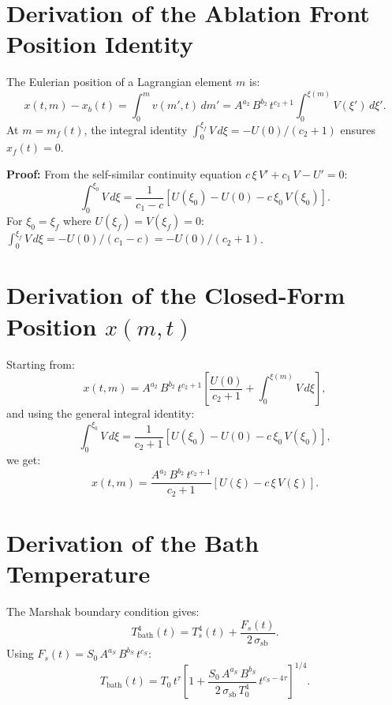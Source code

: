 \documentclass[11pt]{article}
\newcommand{\xsi}{\xi}
\newcommand{\xsif}{\xi_f}
\begin{document}
\section{Derivation of the Ablation Front Position Identity}
\label{app:xf}

The Eulerian position of a Lagrangian element $m$ is:
\begin{equation}
  x(t,m) - x_b(t) = \int_0^m v(m',t)\,dm' = A^{a_2}\,B^{b_2}\,t^{c_2+1}\int_0^{\xsi(m)} V(\xsi')\,d\xsi'.
\end{equation}
At $m = m_f(t)$, the integral identity $\int_0^{\xsif} V\,d\xsi = -U(0)/(c_2+1)$ ensures $x_f(t) = 0$.

\textbf{Proof:} From the self-similar continuity equation $c\,\xsi\,V' + c_1\,V - U' = 0$:
\begin{equation}
  \int_0^{\xsi_0} V\,d\xsi = \frac{1}{c_1-c}\left[U(\xsi_0) - U(0) - c\,\xsi_0\,V(\xsi_0)\right].
\end{equation}
For $\xsi_0 = \xsif$ where $U(\xsif) = V(\xsif) = 0$: $\int_0^{\xsif} V\,d\xsi = -U(0)/(c_1-c) = -U(0)/(c_2+1)$.

\section{Derivation of the Closed-Form Position $x(m,t)$}
\label{app:x_closed}

Starting from:
\begin{equation}
  x(t,m) = A^{a_2}\,B^{b_2}\,t^{c_2+1}\left[\frac{U(0)}{c_2+1} + \int_0^{\xsi(m)} V\,d\xsi\right],
\end{equation}
and using the general integral identity:
\begin{equation}
  \int_0^{\xsi_0} V\,d\xsi = \frac{1}{c_2+1}\left[U(\xsi_0) - U(0) - c\,\xsi_0\,V(\xsi_0)\right],
\end{equation}
we get:
\begin{equation}
  x(t,m) = \frac{A^{a_2}\,B^{b_2}\,t^{c_2+1}}{c_2+1}\left[U(\xsi) - c\,\xsi\,V(\xsi)\right].
\end{equation}

\section{Derivation of the Bath Temperature}
\label{app:bath}

The Marshak boundary condition gives:
\begin{equation}
  T_{\mathrm{bath}}^4(t) = T_s^4(t) + \frac{F_s(t)}{2\,\sigma_{\mathrm{sb}}}.
\end{equation}
Using $F_s(t) = S_0\,A^{a_S}\,B^{b_S}\,t^{c_S}$:
\begin{equation}
  T_{\mathrm{bath}}(t) = T_0\,t^{\tau}\left[1 + \frac{S_0\,A^{a_S}\,B^{b_S}}{2\,\sigma_{\mathrm{sb}}\,T_0^4}\,t^{c_S-4\tau}\right]^{1/4}.
\end{equation}
\end{document}
